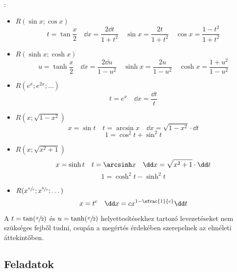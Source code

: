 \documentclass[a4paper, 12pt]{scrartcl}
\begin{document}
\begin{blueBox}
  :
  \begin{itemize}
    \item $R(\sin x; \cos x)$
          \[
            t = \tan \frac{x}{2}
            \quad
            \dd x = \frac{2 \dd t}{1 + t^2}
            \quad
            \sin x = \frac{2t}{1 + t^2}
            \quad
            \cos x = \frac{1 - t^2}{1 + t^2}
          \]

    \item $R(\sinh x; \cosh x)$
          \[
            u = \tanh \frac{x}{2}
            \quad
            \dd x = \frac{2 \dd u}{1 - u^2}
            \quad
            \sinh x = \frac{2u}{1 - u^2}
            \quad
            \cosh x = \frac{1 + u^2}{1 - u^2}
          \]

    \item $R(e^x; e^{2x}; \dots)$
          \[
            t = e^x
            \quad
            \dd x = \frac{\dd t}{t}
          \]

    \item $R(x; \sqrt{1 - x^2})$
          \[
            x = \sin t
            \quad
            t = \arcsin x
            \quad
            \dd x = \sqrt{1 - x^2} \cdot \dd t
          \]\[
            1 = \cos^2 t + \sin^2 t
          \]

    \item $R(x; \sqrt{x^2 + 1})$
          \[
            x = \sinh t
            \quad
            t = \arcsinh x
            \quad
            \dd x = \sqrt{x^2 + 1} \cdot \dd t
          \]\[
            1 = \cosh^2 t - \sinh^2 t
          \]

    \item $R(x^{\sfrac{a}{c}}; x^{\sfrac{b}{c}}; \dots)$
          \[
            x = t^c
            \quad
            \dd x = c x^{1 - \sfrac{1}{c}} \dd t
          \]
  \end{itemize}
\end{blueBox}

\begin{note}
  A $t = \tan(\sfrac{x}{2})$ és $u = \tanh(\sfrac{x}{2})$ helyettesítésekhez
  tartozó levezetéseket nem szükséges fejből tudni, csupán a megértés érdekében
  szerepelnek az elméleti áttekintőben.
\end{note}

\clearpage
\subsection{Feladatok}
\end{document}
